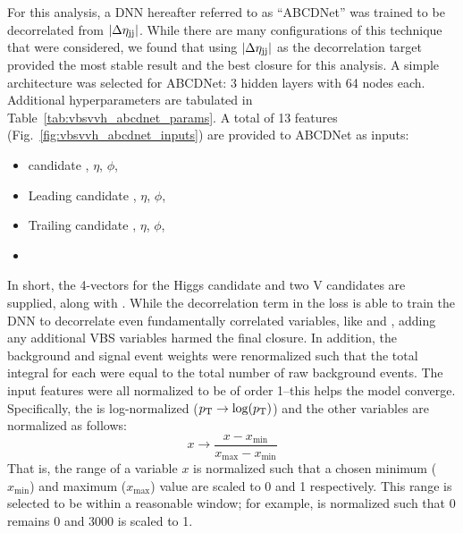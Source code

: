 For this analysis, a DNN hereafter referred to as ``ABCDNet'' was trained to be decorrelated from $|\Delta\eta_{\mathrm{j}\mathrm{j}}|$.
While there are many configurations of this technique that were considered, we found that using $|\Delta\eta_{\mathrm{j}\mathrm{j}}|$ as the decorrelation target provided the most stable result and the best closure for this analysis. 
A simple architecture was selected for ABCDNet: 3 hidden layers with 64 nodes each. %
Additional hyperparameters are tabulated in Table~\ref{tab:vbsvvh_abcdnet_params}. 
A total of 13 features (Fig.~\ref{fig:vbsvvh_abcdnet_inputs}) are provided to ABCDNet as inputs:
\begin{itemize}
    \item \Htobb candidate \pt, $\eta$, $\phi$, \MPNet
    \item Leading \Vtoqq candidate \pt, $\eta$, $\phi$, \MPNet
    \item Trailing \Vtoqq candidate \pt, $\eta$, $\phi$, \MPNet
    \item \Mjj
\end{itemize}
In short, the 4-vectors for the Higgs candidate and two V candidates are supplied, along with \Mjj. 
While the decorrelation term in the loss is able to train the DNN to decorrelate even fundamentally correlated variables, like \Mjj and \detajj, adding any additional VBS variables harmed the final closure. 
In addition, the background and signal event weights were renormalized such that the total integral for each were equal to the total number of raw background events.
The input features were all normalized to be of order 1--this helps the model converge. 
Specifically, the \pt is log-normalized ($p_{\mathrm{T}} \rightarrow \log(p_{\mathrm{T}})$) and the other variables are normalized as follows:
\begin{equation}
    x \rightarrow \frac{x - x_\text{min}}{x_\text{max} - x_\text{min}}
\end{equation}
That is, the range of a variable $x$ is normalized such that a chosen minimum ($x_\text{min}$) and maximum ($x_\text{max}$) value are scaled to 0 and 1 respectively. 
This range is selected to be within a reasonable window; for example, \Mjj is normalized such that 0 remains 0 and 3000 is scaled to 1.

